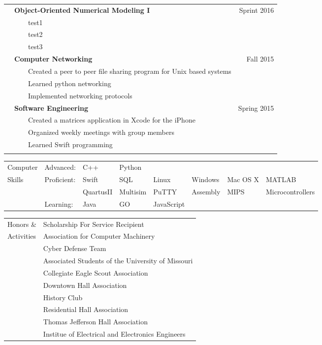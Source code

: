 \documentclass{article}
\newcommand{\tabitem}{~~\llap{\textbullet}~~}
\begin{document}
\begin{tabular}{p{1.5cm} p{10.95cm} r}
			& \textbf{Object-Oriented Numerical Modeling I} 					& Sprint 2016 			\\
			& \tabitem test1 													& 						\\
			& \tabitem test2 													& 						\\
			& \tabitem test3 													& 						\\

			& \textbf{Computer Networking} 										& Fall 2015 			\\
			& \tabitem Created a peer to peer file sharing program for Unix based systems 		& 						\\
			& \tabitem Learned python networking 								& 						\\
			& \tabitem Implemented networking protocols 						& 						\\

			& \textbf{Software Engineering} 									& Spring 2015 			\\
			& \tabitem Created a matrices application in Xcode for the iPhone 	& 						\\
			& \tabitem Organized weekly meetings with group members 			& 						\\
			& \tabitem Learned Swift programming 								& 						\\ \\
\end{tabular}

\begin{tabular}{p{1.5cm} l l l l l l l}
Computer	& Advanced: 	& C++ 		& Python 	& 			& 			& 			& 					\\
Skills		& Proficient:	& Swift 	& SQL 		& Linux 	& Windows 	& Mac OS X 	& MATLAB 			\\
			&				& QuartusII & Multisim 	& PuTTY 	& Assembly 	& MIPS 		& Microcontrollers  \\
			& Learning:		& Java 		& GO 		& JavaScript & 			& 			&\\
\end{tabular}

\begin{tabular}{p{1.5cm} l}
Honors \&	& Scholarship For Service Recipient 														\\
Activities	& Association for Computer Machinery 														\\
			& Cyber Defense Team 																		\\
			& Associated Students of the University of Missouri 										\\
			& Collegiate Eagle Scout Association 														\\
			& Downtown Hall Association 																\\
			& History Club 																				\\
			& Residential Hall Association 																\\
			& Thomas Jefferson Hall Association 														\\
			& Institue of Electrical and Electronics Engineers 											\\
\end{tabular}
\end{document}
